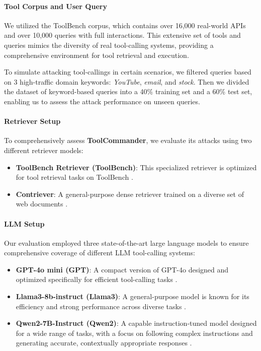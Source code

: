 \paragraph{Tool Corpus and User Query}
We utilized the ToolBench\cite{qin2023toolllm} corpus, which contains over 16,000 real-world APIs and over 10,000 queries with full interactions. This extensive set of tools and queries mimics the diversity of real tool-calling systems, providing a comprehensive environment for tool retrieval and execution.

To simulate attacking tool-callings in certain scenarios, we filtered queries based on 3 high-traffic domain keywords: \textit{YouTube}, \textit{email}, and \textit{stock}. Then we divided the dataset of keyword-based queries into a 40\% training set and a 60\% test set, enabling us to assess the attack performance on unseen queries.

\paragraph{Retriever Setup}
To comprehensively assess \textbf{ToolCommander}, we evaluate its attacks using two different retriever models:
\begin{itemize}
    \item \textbf{ToolBench Retriever (ToolBench)}: This specialized retriever is optimized for tool retrieval tasks on ToolBench \cite{qin2023toolllm}.
    \item \textbf{Contriever}: A general-purpose dense retriever trained on a diverse set of web documents \cite{izacard2021unsupervised}.
\end{itemize}

\paragraph{LLM Setup}
Our evaluation employed three state-of-the-art large language models to ensure comprehensive coverage of different LLM tool-calling systems:
\begin{itemize}
    \item \textbf{GPT-4o mini (GPT)}: A compact version of GPT-4o designed and optimized specifically for efficient tool-calling tasks \cite{gpt4omini}.
    \item \textbf{Llama3-8b-instruct (Llama3)}: A general-purpose model is known for its efficiency and strong performance across diverse tasks \cite{dubey2024llama}.
    \item \textbf{Qwen2-7B-Instruct (Qwen2)}: A capable instruction-tuned model designed for a wide range of tasks, with a focus on following complex instructions and generating accurate, contextually appropriate responses \cite{yang2024qwen2}.
\end{itemize}

